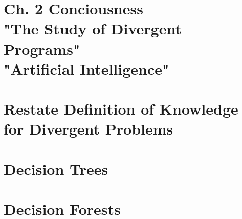 \documentclass[11pt]{article}
\begin{document}
\section*{Ch. 2 Conciousness\\
"The Study of Divergent Programs"\\
"Artificial Intelligence"}

\section{Restate Definition of Knowledge for Divergent Problems}

\section{Decision Trees}

\section{Decision Forests}
\end{document}
